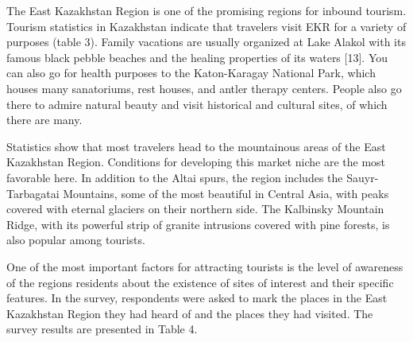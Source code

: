 \begin{multicols}{2}
The East Kazakhstan Region is one of the promising regions for inbound
tourism. Tourism statistics in Kazakhstan indicate that travelers visit
EKR for a variety of purposes (table 3). Family vacations are usually
organized at Lake Alakol with its famous black pebble beaches and the
healing properties of its waters {[}13{]}. You can also go for health
purposes to the Katon-Karagay National Park, which houses many
sanatoriums, rest houses, and antler therapy centers. People also go
there to admire natural beauty and visit historical and cultural sites,
of which there are many.

Statistics show that most travelers head to the mountainous areas of the
East Kazakhstan Region. Conditions for developing this market niche are
the most favorable here. In addition to the Altai spurs, the region
includes the Sauyr-Tarbagatai Mountains, some of the most beautiful in
Central Asia, with peaks covered with eternal glaciers on their northern
side. The Kalbinsky Mountain Ridge, with its powerful strip of granite
intrusions covered with pine forests, is also popular among tourists.

One of the most important factors for attracting tourists is the level
of awareness of the region\textquotesingle s residents about the
existence of sites of interest and their specific features. In the
survey, respondents were asked to mark the places in the East Kazakhstan
Region they had heard of and the places they had visited. The survey
results are presented in Table 4.
\end{multicols}

